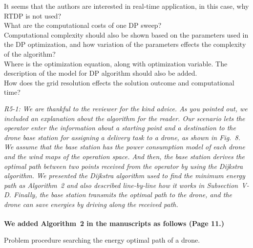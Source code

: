 \documentclass[onecolumn]{IEEEconf}
\begin{document}
\begin{description}
{    It seems that the authors are interested in real-time application, in this case, why RTDP is not used? ~\\
    What are the computational costs of one DP sweep?~\\
    Computational complexity should also be shown based on the parameters used in the DP optimization, and how variation of the parameters effects the complexity of the algorithm?~\\
    Where is the optimization equation, along with optimization variable. The description of the model for DP algorithm should also be added.~\\
    How does the grid resolution effects the solution outcome and computational time?~\\
	}
	\item \textit
	{
	R5-1: We are thankful to the reviewer for the kind advice. As you pointed out, we included an explanation about the algorithm for the reader.
    Our scenario lets the operator enter the information about a starting point and a destination to the drone base station for assigning a delivery task to a drone, as shown in Fig.~8. We assume that the base station has the power consumption model of each drone and the wind maps of the operation space. 
    And then, the base station derives the optimal path between two points received from the operator by using the Dijkstra algorithm.
    We presented the Dijkstra algorithm used to find the minimum energy path as Algorithm~2 and also described line-by-line how it works in Subsection~V-D.
    Finally, the base station transmits the optimal path to the drone, and the drone can save energies by driving along the received path.
	}
	~\\
    \pagebreak ~\\
	\textbf{We added Algorithm~2 in the manuscripts as follows (Page 11.)}
    \SetNlSty{}{\color{red}}{:}
    \SetAlFnt{\color{red}}
    \setcounter{algocf}{1}
    \begin{algorithm}[h]
    \caption{Problem procedure searching the energy optimal path of a drone.}
    \KwIn{\\
    \hskip1.5em $G$ // A created graph  \\
    \hskip1.5em $n_s$ // A source node  \\
    \hskip1.5em $n_d$ // A destination node 
}
\end{algorithm}
\end{description}
\end{document}
